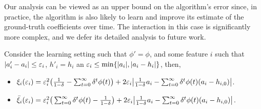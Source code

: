 Our analysis can be viewed as an upper bound on the algorithm's error since, in practice, the algorithm is also likely to learn and improve its estimate of the ground-truth coefficients over time. The interaction in this case is significantly more complex, and we defer its detailed analysis to future work.

\begin{observation} \label{obse-err-a-learning}
Consider the learning setting such that $\phi'=\phi$, and some feature $i$ such that $|a'_i-a_i|\leq \varepsilon_i$, $h'_i= h_i$ an $ \varepsilon_i \leq \min\{|a_i|,|a_i-h_i|\}$, then,
\begin{itemize}
\item  $\xi_i(\varepsilon_i) = \varepsilon_i^2\big(\frac{1}{1-\delta}-\sum_{t=0}^\infty \delta^t \phi(t)\big) + 2\varepsilon_i \big|\frac{1}{1-\delta} a_i - \sum_{t=0}^\infty \delta^t \phi(t)(a_i-h_{i,0})\big|$.
\item $\bar \xi_i(\varepsilon_i) = \varepsilon_i^2\big(\sum_{t=0}^\infty \delta^t \phi(t) - \frac{1}{1-\delta}\big) +2\varepsilon_i \big|\frac{1}{1-\delta} a_i - \sum_{t=0}^\infty \delta^t \phi(t)(a_i-h_{i,0})\big|$.
\end{itemize}
\end{observation}
